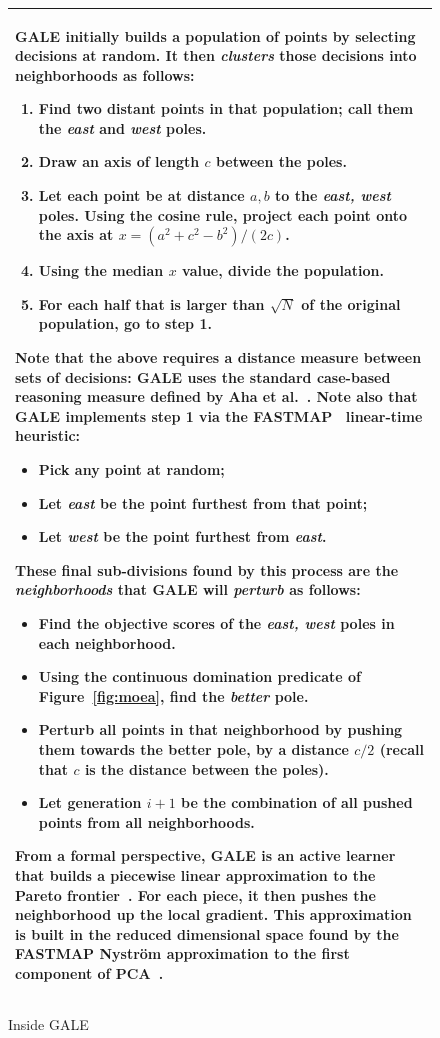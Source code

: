\documentclass[journal]{IEEEtran}
\newcommand{\fig}[1]{Figure~\ref{fig:#1}}
\begin{document}
\begin{figure}
\small
\begin{tabular}{|p{.95\linewidth}|}\hline
GALE initially builds a population of points by selecting
decisions at random. 
It then {\em clusters} those decisions into neighborhoods as follows:
\begin{enumerate}
\item
Find two distant points in that population; call them the {\em east} and {\em west} poles. 
\item 
Draw an axis of length $c$ between the poles. 
\item
Let each point be at distance $a,b$ to the {\em east, west} poles.
Using the cosine rule, project each point onto the  axis  at $x=(a^2 + c^2 - b^2)/(2c)$.  
\item 
Using the median $x$ value, divide the population.
\item
For each half that is larger than $\sqrt{N}$ of the original population, go to step 1.
\end{enumerate}
Note that the above requires a distance measure between sets of decisions: GALE uses the standard case-based reasoning measure defined by Aha et al.~\cite{aha91}. 
Note also that GALE implements step 1 via  the FASTMAP~\cite{Faloutsos1995} linear-time heuristic:
\begin{itemize}
\item
Pick any point at random; 
\item Let {\em east} be the point furthest from that point; 
\item Let {\em west} be the point furthest from {\em east}.
\end{itemize}
These final sub-divisions found by this process are the {\em neighborhoods} that
GALE will {\em perturb} as follows:
\begin{itemize}
\item
Find the objective scores of the {\em east, west} poles in each neighborhood.
\item 
Using the continuous domination predicate of \fig{moea}, find  the {\em better} pole. 
\item
Perturb all points in that neighborhood by pushing them towards the better pole, by a distance  $c/2$ (recall that  $c$ is the distance between the poles).
\item
Let generation $i+1$ be the combination of all pushed points from all neighborhoods.
\end{itemize}
From a formal perspective, GALE is an active learner~\cite{Dasgupta2005} that builds a piecewise linear approximation to the Pareto frontier~\cite{Zuluaga:13}.
For each piece, it then pushes the neighborhood up the local gradient.
This  approximation is built in the reduced dimensional space found by the FASTMAP  Nystr\"om approximation to the first component of PCA~\cite{platt05}.
\\\hline
\end{tabular}
\caption{Inside GALE}\label{fig:gale}
\end{figure}
\end{document}
